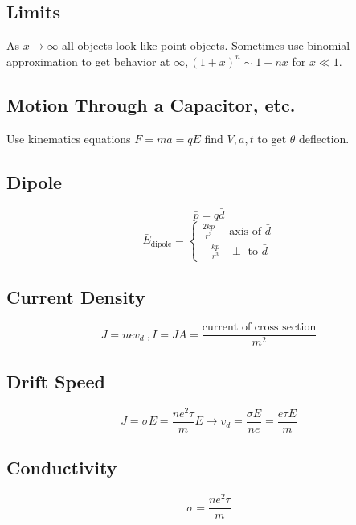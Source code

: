 \documentclass[10pt,letter]{article}
\begin{document}
\subsection{Limits} %
\label{sub:limits}
As $x \rightarrow \infty$ all objects look like point objects. Sometimes use binomial approximation to get behavior at $\infty, (1+x)^n \sim 1+nx$ for $x \ll 1$.
\subsection{Motion Through a Capacitor, etc.} %
\label{sub:motion_through_a_capacitor}
Use kinematics equations $F=ma=qE$ find $V,a,t$ to get $\theta $ deflection.
\subsection{Dipole} %
\label{sub:dipole}
\begin{equation}
    \bar{p} = q \bar{d}
\end{equation}
\[
 \bar{E}_{\textrm{dipole}} =
  \begin{cases}
   \frac{2k\bar{p}}{r^3}  & \textrm{axis of }\bar{d}  \\
   -\frac{k \bar{p}}{r^3} &  \perp \textrm{ to }\bar{d}
  \end{cases}
\]

\subsection{Current Density} %
\label{sub:current_density}
\begin{equation}
    J = nev_d~,I=JA=\frac{\textrm{current of cross section}}{m^2}
\end{equation}
\subsection{Drift Speed} %
\label{sub:drift_speed}
\begin{equation}
    J = \sigma E= \frac{ne^2\tau}{m}E \rightarrow v_d = \frac{\sigma E }{ne} = \frac{e \tau E}{m}
\end{equation}
\subsection{Conductivity} %
\label{sub:conductivity}
\begin{equation}
    \sigma = \frac{ne^2\tau}{m}
\end{equation}
\end{document}
